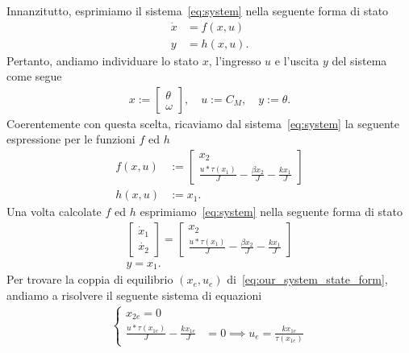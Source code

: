 \documentclass[a4paper, 11pt]{article}
\begin{document}
	Innanzitutto, esprimiamo il sistema~\eqref{eq:system} nella seguente forma di stato
	\begin{subequations}
		\begin{align}\label{eq:state_form}
			\dot{x} &= f(x,u)
			\\
			y &= h(x,u).
		\end{align}
	\end{subequations}
	Pertanto, andiamo individuare lo stato $x$, l'ingresso $u$ e l'uscita $y$ del sistema come segue 
	\begin{align*}
		x := \begin{bmatrix}
			\theta \\
			\omega
		\end{bmatrix}, \quad u := C_M, \quad y := \theta.
	\end{align*}
	Coerentemente con questa scelta, ricaviamo dal sistema~\eqref{eq:system} la seguente espressione per le funzioni $f$ ed $h$
	\begin{align*}
		f(x,u) &:= \begin{bmatrix}
			x_2 \\
			\frac{u*\tau(x_1)}{J}-\frac{\beta x_2}{J}-\frac{k x_1}{J}
		\end{bmatrix}
		\\
		h(x,u) &:= x_1.
	\end{align*}
	Una volta calcolate $f$ ed $h$ esprimiamo~\eqref{eq:system} nella seguente forma di stato
	\begin{subequations}\label{eq:our_system_state_form}
		\begin{gather*}
			\begin{bmatrix}
				\dot{x}_1
				\\
				\dot{x_2}
			\end{bmatrix} = \begin{bmatrix}
				x_2 \\
				\frac{u*\tau(x_1)}{J}-\frac{\beta x_2}{J}- \frac{k x_1}{J}
			\end{bmatrix} \label{eq:state_form_1}
			\\ 
			y = x_1.
		\end{gather*}
	\end{subequations}
	Per trovare la coppia di equilibrio $(x_e, u_e)$ di~\eqref{eq:our_system_state_form}, andiamo a risolvere il seguente sistema di equazioni
	\begin{align}
		\begin{cases}
			x_{2e} = 0 \\
			\frac{u*\tau(x_{1e})}{J} - \frac{k x_{1e} } {J} &= 0 \implies u_e = \frac{k x_{1e}}{\tau(x_{1e})}
		\end{cases}
	\end{align}
\end{document}
